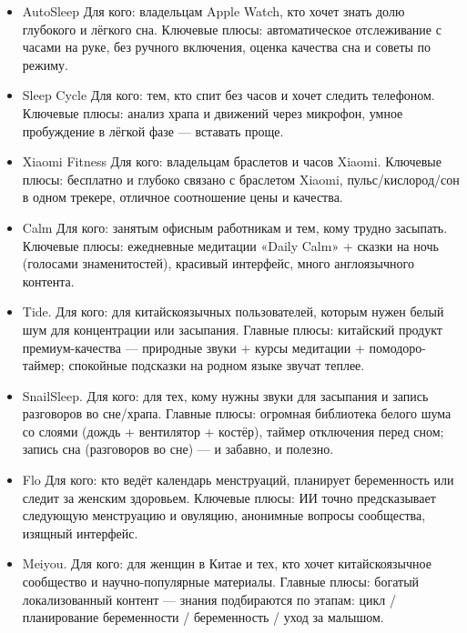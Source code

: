 
\begin{itemize}
  \item AutoSleep Для кого: владельцам Apple Watch, кто хочет знать долю глубокого и лёгкого сна. Ключевые плюсы: автоматическое отслеживание с часами на руке, без ручного включения, оценка качества сна и советы по режиму.
  \item Sleep Cycle Для кого: тем, кто спит без часов и хочет следить телефоном. Ключевые плюсы: анализ храпа и движений через микрофон, умное пробуждение в лёгкой фазе — вставать проще.
  \item Xiaomi Fitness Для кого: владельцам браслетов и часов Xiaomi. Ключевые плюсы: бесплатно и глубоко связано с браслетом Xiaomi, пульс/кислород/сон в одном трекере, отличное соотношение цены и качества.
\end{itemize}


\begin{itemize}
  \item Calm Для кого: занятым офисным работникам и тем, кому трудно засыпать. Ключевые плюсы: ежедневные медитации «Daily Calm» + сказки на ночь (голосами знаменитостей), красивый интерфейс, много англоязычного контента.
  \item Tide. Для кого: для китайскоязычных пользователей, которым нужен белый шум для концентрации или засыпания. Главные плюсы: китайский продукт премиум-качества — природные звуки + курсы медитации + помодоро-таймер; спокойные подсказки на родном языке звучат теплее.
  \item SnailSleep. Для кого: для тех, кому нужны звуки для засыпания и запись разговоров во сне/храпа. Главные плюсы: огромная библиотека белого шума со слоями (дождь + вентилятор + костёр), таймер отключения перед сном; запись сна (разговоров во сне) — и забавно, и полезно.
\end{itemize}


\begin{itemize}
  \item Flo Для кого: кто ведёт календарь менструаций, планирует беременность или следит за женским здоровьем. Ключевые плюсы: ИИ точно предсказывает следующую менструацию и овуляцию, анонимные вопросы сообщества, изящный интерфейс.
  \item Meiyou. Для кого: для женщин в Китае и тех, кто хочет китайскоязычное сообщество и научно-популярные материалы. Главные плюсы: богатый локализованный контент — знания подбираются по этапам: цикл / планирование беременности / беременность / уход за малышом.
\end{itemize}

